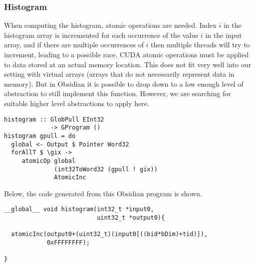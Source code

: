 \subsubsection{Histogram} 

When computing the histogram, atomic operations are needed. Index $i$
in the histogram array is incremented for each occurrence of the value
$i$ in the input array, and if there are multiple occurrences of $i$
then multiple threads will try to increment, leading to a possible race.
CUDA atomic operations must be applied to data stored at an actual memory 
location. This does not fit very well into our setting with virtual arrays 
(arrays that do not necessarily represent data in memory). But in Obsidian 
it is possible to drop down to a low enough level of abstraction to still 
implement this function. However, we are searching for suitable higher level 
abstractions to apply here.


\begin{small} 
\begin{Verbatim}[samepage=true] 
histogram :: GlobPull EInt32 
             -> GProgram ()
histogram gpull = do
  global <- Output $ Pointer Word32 
  forAllT $ \gix -> 
     atomicOp global 
              (int32ToWord32 (gpull ! gix)) 
              AtomicInc
\end{Verbatim} 
\end{small} 

Below, the code generated from this Obsidian program is shown.

\begin{small}
\begin{Verbatim}[samepage=true] 
__global__ void histogram(int32_t *input0,
                          uint32_t *output0){
  
  atomicInc(output0+(uint32_t)(input0[((bid*bDim)+tid)]),
            0xFFFFFFFF);
  
}
\end{Verbatim}
\end{small}


